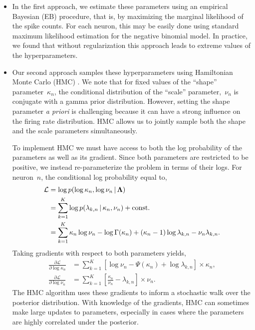 \begin{itemize}

\item In the first approach, we estimate these parameters using an
  empirical Bayesian (EB) procedure, that is, by maximizing the
  marginal likelihood of the spike counts.  For each neuron, this may be
  easily done using standard maximum likelihood estimation for the
  negative binomial model.  In practice, we found that without
  regularization this approach leads to extreme values of the
  hyperparameters.

 

\item Our second approach samples these hyperparameters using
  Hamiltonian Monte Carlo (HMC) \citep{Neal10}. We note that for fixed
  values of the ``shape'' parameter~$\kappa_n$, the conditional
  distribution of the ``scale'' parameter,~$\nu_n$ is conjugate
  with a gamma prior distribution. However, setting the shape
  parameter \textit{a priori} is challenging because it can have a
  strong influence on the firing rate distribution. HMC allows us to
  jointly sample both the shape and the scale parameters
  simultaneously.

To implement HMC we must have access to both the log probability of
the parameters as well as its gradient. Since both parameters are
restricted to be positive, we instead re-parameterize the problem in
terms of their logs. For neuron~$n$, the conditional log probability
equal to,
\begin{align*}
\mathcal{L} 
  &= \log p(\log \kappa_n, \log \nu_n \,|\, \boldsymbol{\Lambda}) \\
  &= \sum_{k=1}^K \log p(\lambda_{k,n} \,|\, \kappa_n, \nu_n) + \text{const.} \\
  &= \sum_{k=1}^K \kappa_n \log \nu_n - \log \Gamma(\kappa_n) + (\kappa_n - 1) \log \lambda_{k,n} - \nu_n \lambda_{k,n}.
\end{align*}
Taking gradients with respect to both parameters yields,
\begin{align*}
  \frac{\partial \mathcal{L}}{\partial \log \kappa_n} 
  &= \sum_{k=1}^K \left[ \log \nu_n -\Psi(\kappa_n) + \log \lambda_{k,n} \right] \times \kappa_n, \\
  \frac{\partial \mathcal{L}}{\partial \log \nu_n} 
  &= \sum_{k=1}^K \left[ \frac{\kappa_n}{\nu_n}  - \lambda_{k,n} \right] \times \nu_n.
\end{align*}
The HMC algorithm uses these gradients to inform a stochastic walk
over the posterior distribution. With knowledge of the gradients, HMC
can sometimes make large updates to parameters, especially in cases
where the parameters are highly correlated under the posterior.



\end{itemize}
